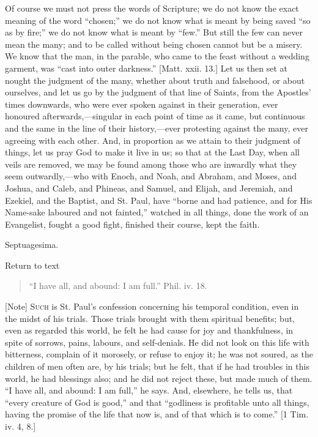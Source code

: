 Of course we must not press the words of Scripture; we do not know
the exact meaning of the word ``chosen;'' we do not know what is
meant by being saved ``so as by fire;'' we do not know what is
meant by ``few.'' But still the few can never mean the many;
and to be called without being chosen cannot but be a misery. We know
that the man, in the parable, who came to the feast without a wedding
garment, was ``cast into outer darkness.'' [Matt. xxii. 13.]
Let us then set at nought the judgment of the many, whether about
truth and falsehood, or about ourselves, and let us go by the judgment
of that line of Saints, from the Apostles' times downwards, who were
ever spoken against in their generation, ever honoured afterwards,—singular
in each point of time as it came, but continuous and the same in the
line of their history,—ever protesting against the many, ever
agreeing with each other. And, in proportion as we attain to their
judgment of things, let us pray God to make it live in us; so that at
the Last Day, when all veils are removed, we may be found among those
who are inwardly what they seem outwardly,—who with Enoch, and Noah,
and Abraham, and Moses, and Joshua, and Caleb, and Phineas, and
Samuel, and Elijah, and Jeremiah, and Ezekiel, and the Baptist, and
St. Paul, have ``borne and had patience, and for His Name-sake
laboured and not fainted,'' watched in all things, done the work
of an Evangelist, fought a good fight, finished their course, kept the
faith.


Septuagesima.

Return to text


\begin{quote}

``I have all, and abound: I am full.'' Phil. iv. 18.

\end{quote}

[Note] S\textsc{uch} is St. Paul's
confession concerning his temporal condition, even in the midst of his
trials. Those trials brought with them spiritual benefits; but, even
as regarded this world, he felt he had cause for joy and thankfulness,
in spite of sorrows, pains, labours, and self-denials. He did not look
on this life with bitterness, complain of it morosely, or refuse to
enjoy it; he was not soured, as the children of men often are, by his
trials; but he felt, that if he had troubles in this world, he had
blessings also; and he did not reject these, but made much of them.
``I have all, and abound: I am full,'' he says. And,
elsewhere, he tells us, that ``every creature of God is
good,'' and that ``godliness is profitable unto all things,
having the promise of the life that now is, and of that which is to
come.'' [1 Tim. iv. 4, 8.]

